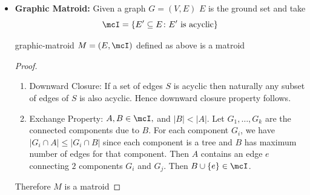 \begin{itemize}[label=$\bullet$]
\begin{proof}
\begin{enumerate}[label=\bfseries\tiny\protect\circled{\small\arabic*}]
		 Now we take a look at the chain $\sL_{e_i}$. For brevity we will use $e$ instead of $e_i$. So in the chain $\sL_e=\{L_1,\dots, L_n\}$ such that  we have $$L_n\supseteq L_{n-1}\supseteq \cdots \supseteq L_2\supseteq L_1$$Then take $i\in[n]$ to be the largest index such that $|A\cap L_i|\leq |B\cap L_i|$. There will be such an index because otherwise we will have $|A|\leq |B|$ which is not possible. Then take $e^*\in (A\cap L_{i+1})-(L_i\cup B)$. Such an $e^*$ will exist because $|A\cap L_{i+1}|>|A\cap L_{i+1}|\implies A\cap (L_{i+1}- L_{i}\neq \emptyset$ and also $A\cap (L_{i+1}- L_{i}\not\subseteq B\cap (L_{i+1}-L_i)$ because otherwise we will have $$|A\cap L_{i+1}|=|A\cap (L_{i+1}- L_{i}|+|A\cap L_{i+1}|\leq |B\cap (L_{i+1}-L_i)|+|B\cap L_i|=|B\cap L_{i+1}|$$which is not possible. Hence there exists $e^*$ such that $e^*\in (A\cap L_{i+1})-(L_i\cup B)$. Therefore take $B^*=B\cup \{e^*\}$. Then for all $j< i$ we have $B^*\cap L_j=B\cap L_j$ so we don't have a problem there. Now for all $j\geq i$ we have $|A\cap L_j|>|B\cap L_j|$. Hence now $|B^*\cap L_j|\leq |B\cap L_j|+1\leq |A\cap L_j|\leq k(L_j)$. Therefore we have $B^*\in\mcI$. Hence the exchange property follows.
	\end{enumerate}
Therefore $M$ is a matroid.
\end{proof}
\item \textbf{Graphic Matroid:} Given a graph $G=(V,E)$ $E$ is the ground set and take $$\mcI=\{E'\subseteq E\colon E'\text{ is acyclic} \}$$
\begin{lemma}{}{graphic-matroid}
	$M=(E,\mcI)$ defined as above is a matroid
\end{lemma}
\begin{proof}
	\begin{enumerate}[label=\bfseries\tiny\protect\circled{\small\arabic*}]
		\item Downward Closure: If a set of edges $S$ is acyclic then naturally any subset of edges of $S$ is also acyclic. Hence downward closure property follows.
		\item Exchange Property: $A,B\in\mcI,$ and $ |B|<|A|$. Let $G_1,\dots, G_k$ are the connected components due to $B$. For each component $G_i$, we have $|G_i\cap A|\leq |G_i\cap B|$ since each component is a tree and $B$ has maximum number of edges for that component. Then $A$ contains an edge $e$ connecting $2$ components $G_i$ and $G_j$. Then $B\cup \{e\}\in \mcI$. 
	\end{enumerate}Therefore $M$ is a matroid
\end{proof}


\end{itemize}
